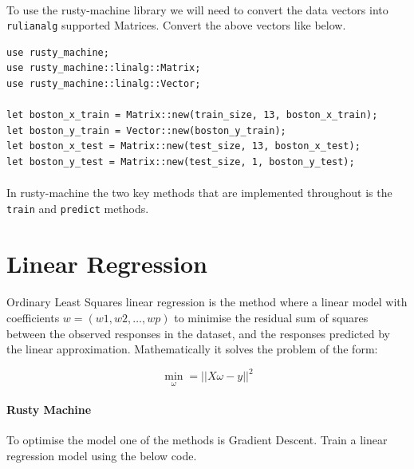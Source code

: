 \documentclass{book}
\begin{document}
\paragraph{}%
To use the rusty-machine library we will need to convert the data vectors into \lstinline{rulianalg} supported Matrices. Convert the above vectors like below.
\label{par:}

\begin{lstlisting}[caption={chapter2\\/rustlymachine\_regression\\/src\\/lin\_reg\\.rs}]
use rusty_machine;
use rusty_machine::linalg::Matrix;
use rusty_machine::linalg::Vector;

let boston_x_train = Matrix::new(train_size, 13, boston_x_train);
let boston_y_train = Vector::new(boston_y_train);
let boston_x_test = Matrix::new(test_size, 13, boston_x_test);
let boston_y_test = Matrix::new(test_size, 1, boston_y_test);
\end{lstlisting}

\paragraph{}%
In rusty-machine the two key methods that are implemented throughout is the \lstinline{train} and \lstinline{predict} methods.
\label{par:}

\label{sub:rusty_machine_library}

\section{Linear Regression}%

\paragraph{}%
Ordinary Least Squares linear regression is the method where a linear model with coefficients $w = (w1, w2, \dots, wp)$ to minimise the residual sum of squares between the observed responses in the dataset, and the responses predicted by the linear approximation. Mathematically it solves the problem of the form:
\label{par:}

\begin{equation}
	\underset{\omega}{\min} = || X\omega - y ||^2
\end{equation}

\paragraph{Rusty Machine}%
To optimise the model one of the methods is Gradient Descent. Train a linear regression model using the below code.
\end{document}
